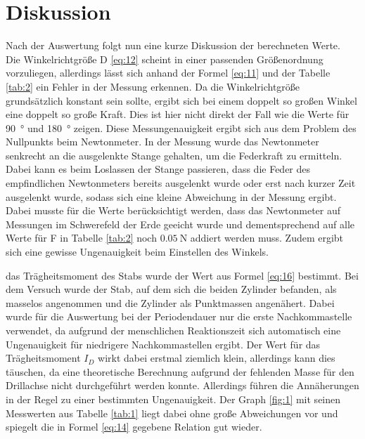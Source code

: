
\section{Diskussion}\justifying
Nach der Auswertung folgt nun eine kurze Diskussion der berechneten Werte.\\
Die Winkelrichtgröße D \eqref{eq:12} scheint in einer passenden
Größenordnung vorzuliegen, allerdings lässt sich anhand der Formel \eqref{eq:11}
und der Tabelle \ref{tab:2} ein Fehler in der Messung erkennen.
Da die Winkelrichtgröße grundsätzlich konstant sein sollte, ergibt sich bei einem
doppelt so großen Winkel eine doppelt so große Kraft. Dies ist hier nicht direkt der Fall
wie die Werte für \SI{90}{\degree} und \SI{180}{\degree} zeigen. Diese Messungenauigkeit
ergibt sich aus dem Problem des Nullpunkts beim Newtonmeter. In der Messung wurde das
Newtonmeter senkrecht an die ausgelenkte Stange gehalten, um die Federkraft zu ermitteln. Dabei kann es
beim Loslassen der Stange passieren, dass die Feder des empfindlichen Newtonmeters bereits ausgelenkt wurde oder 
erst nach kurzer Zeit ausgelenkt wurde, sodass sich eine kleine Abweichung in der Messung ergibt.
Dabei musste für die Werte berücksichtigt werden, dass das Newtonmeter auf Messungen im 
Schwerefeld der Erde geeicht wurde und dementsprechend auf alle Werte für F in Tabelle 
\ref{tab:2} noch $\SI{0.05}{\newton} $ addiert werden muss. 
Zudem ergibt sich eine gewisse Ungenauigkeit beim Einstellen des Winkels. 

\justifying das Trägheitsmoment des Stabs wurde der Wert aus Formel \eqref{eq:16} bestimmt.
Bei dem Versuch wurde der Stab, auf dem sich die beiden Zylinder befanden, als masselos angenommen  und
die Zylinder als Punktmassen angenähert. Dabei wurde für die Auswertung bei der Periodendauer
nur die erste Nachkommastelle verwendet, da aufgrund der menschlichen Reaktionszeit sich
automatisch eine Ungenauigkeit für niedrigere Nachkommastellen ergibt.
Der Wert für das Trägheitsmoment $I_D$ wirkt dabei erstmal ziemlich klein, allerdings kann
dies täuschen, da eine theoretische Berechnung aufgrund der fehlenden Masse für den 
Drillachse nicht durchgeführt werden konnte. Allerdings führen die Annäherungen in der 
Regel zu einer bestimmten Ungenauigkeit.
Der Graph \ref{fig:1} mit seinen Messwerten aus Tabelle \ref{tab:1} liegt dabei ohne große 
Abweichungen vor und spiegelt die in Formel \eqref{eq:14} gegebene Relation gut wieder.

